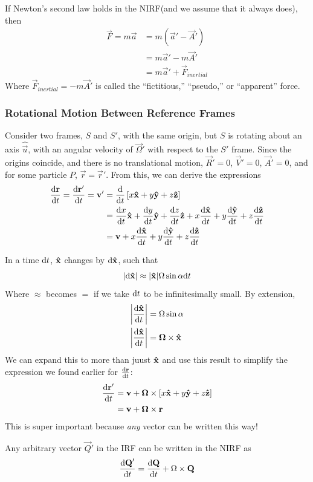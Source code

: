 \documentclass[a4paper]{article}
\begin{document}
If Newton's second law holds in the NIRF(and we assume that it always does),
then
\begin{align*}
	\vec{F} = m\vec{a} &= m(\vec{a}'-\vec{A}')\\
			   &= m\vec{a}'-m\vec{A}'\\
			   &= m\vec{a}'+\vec{F}_{inertial}
\end{align*}
Where $\vec{F}_{inertial} = -m\vec{A}'$ is called the
``fictitious,'' ``pseudo,'' or ``apparent'' force.

\subsubsection{Rotational Motion Between Reference Frames}
Consider two frames, $S$ and $S'$, with the same origin, but $S$ is rotating
about an axis $\hat{\vec{u}}$,
with an angular velocity of $\vec{\Omega}'$ with respect to the $S'$ frame.
Since the origins coincide, and there is no translational motion,
$\vec{R}'=0$, $\vec{V}'=0$, $\vec{A}'=0$, and for some particle $P$,
$\vec{r}=\vec{r}'$.
From this, we can derive the expressions
\begin{align*}
	\frac{\d\vec{r}}{\d t} = \frac{\d\vec{r}'}{\d t} = \vec{v}' &=
	\frac{\d}{\d t}\left[x\x+y\y+z\z\right]\\
	&= \der{x}{t}\x+\der{y}{t}\y+\der{z}{t}\z+x\der{\x}{t}+y\der{\y}{t}+
		z\der{\z}{t}\\
	&= \vec{v} + x\der{\x}{t}+y\der{\y}{t}+z\der{\z}{t}
\end{align*}

\begin{center}
\end{center}

In a time $\d t$, $\x$ changes by $\d\x$, such that
\[ \lvert\d\x\rvert\approx\lvert\x\rvert\Omega\sin\alpha\d t \]
Where $\approx$ becomes $=$ if we take $\d t$ to be infinitesimally small.
By extension,
\begin{align*}
	\left\lvert\frac{\d\x}{\d t}\right\rvert &= \Omega\sin\alpha\\
	\left\lvert\frac{\d\x}{\d t}\right\rvert &= \vec{\Omega}\times\x
\end{align*}
We can expand this to more than juust $\x$ and use this result to simplify the
expression we found earlier for $\frac{\d\vec{r}}{\d t}$:
\begin{align*}
	\frac{\d\vec{r}'}{\d t} &= \vec{v} + \vec{\Omega}\times\left[
		x\x+y\y+z\z\right]\\
		&= \vec{v}+\vec{\Omega}\times\vec{r}
\end{align*}
This is super important because \emph{any} vector can be written this way!
\begin{thm}
	Any arbitrary vector $\vec{Q}'$ in the IRF can be written in the NIRF
	as
	\[\frac{\d\vec{Q}'}{\d t}=\frac{\d\vec{Q}}{\d t}+\Omega\times\vec{Q}\]
\end{thm}
\end{document}
